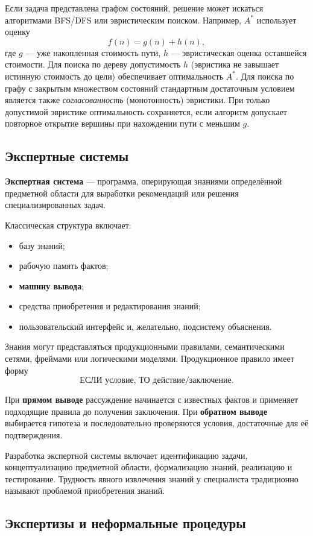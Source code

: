 Если задача представлена графом состояний, решение может искаться алгоритмами BFS/DFS или эвристическим поиском. Например, $A^*$ использует оценку
\[
f(n)=g(n)+h(n),
\]
где $g$ --- уже накопленная стоимость пути, $h$ --- эвристическая оценка оставшейся стоимости. Для поиска по дереву допустимость $h$ (эвристика не завышает истинную стоимость до цели) обеспечивает оптимальность $A^*$. Для поиска по графу с закрытым множеством состояний стандартным достаточным условием является также \emph{согласованность} (монотонность) эвристики. При только допустимой эвристике оптимальность сохраняется, если алгоритм допускает повторное открытие вершины при нахождении пути с меньшим $g$.

\subsection{Экспертные системы}

\textbf{Экспертная система} --- программа, оперирующая знаниями определённой предметной области для выработки рекомендаций или решения специализированных задач.

Классическая структура включает:
\begin{itemize}
\item базу знаний;
\item рабочую память фактов;
\item \textbf{машину вывода};
\item средства приобретения и редактирования знаний;
\item пользовательский интерфейс и, желательно, подсистему объяснения.
\end{itemize}

Знания могут представляться продукционными правилами, семантическими сетями, фреймами или логическими моделями. Продукционное правило имеет форму
\[
\text{ЕСЛИ условие, ТО действие/заключение}.
\]

При \textbf{прямом выводе} рассуждение начинается с известных фактов и применяет подходящие правила до получения заключения. При \textbf{обратном выводе} выбирается гипотеза и последовательно проверяются условия, достаточные для её подтверждения.

Разработка экспертной системы включает идентификацию задачи, концептуализацию предметной области, формализацию знаний, реализацию и тестирование. Трудность явного извлечения знаний у специалиста традиционно называют проблемой приобретения знаний.

\subsection{Экспертизы и неформальные процедуры}

